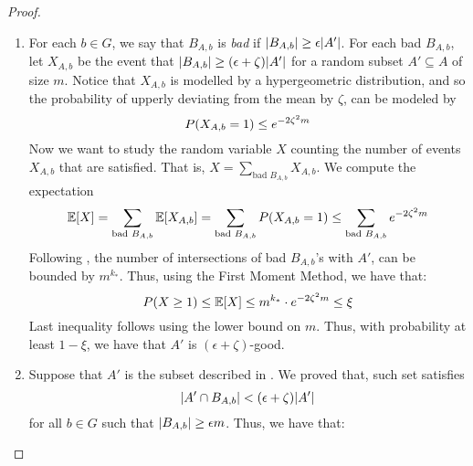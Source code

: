 \begin{lemma}[Claim 5.13]
            \begin{proof}
            \begin{enumerate}[label=(\alph*), ref=\alph*]
                \item For each $b \in G$, we say that $B_{A,b}$ is \emph{bad} if $| B_{A,b} | \geq \epsilon | A' |$.
                    For each bad $B_{A,b}$, let $X_{A,b}$ be the event that
                    $| B_{A,b} | \geq ( \epsilon + \zeta ) | A' |$ for a random subset
                    $A' \subseteq A$ of size $m$.
                    Notice that $X_{A,b}$ is modelled by a hypergeometric distribution, and so the probability of
                    upperly deviating from the mean by $\zeta$, can be modeled by
                    \[
                        P( X_{A,b} = 1 ) \leq e^{-2\zeta^2 m}
                    \]
                    Now we want to study the random variable $X$ counting the number of events $X_{A,b}$ that are satisfied.
                    That is, $X = \sum_{\text{bad } B_{A,b}} X_{A,b}$.
                    We compute the expectation
                    \[
                        \mathbb{E}[X] = \sum_{\text{bad } B_{A,b}} \mathbb{E}[X_{A,b}]
                            = \sum_{\text{bad } B_{A,b}} P( X_{A,b} = 1 )
                            \leq \sum_{\text{bad } B_{A,b}} e^{-2\zeta^2 m}
                    \]
                    Following , the number of intersections of bad $B_{A,b}$'s with $A'$, can be bounded
                    by $m^{k_*}$.
                    Thus, using the First Moment Method, we have that:
                    \[
                        P( X \geq 1 ) \leq \mathbb{E}[X] \leq m^{k_*} \cdot e^{-2\zeta^2 m} \leq \xi
                    \]
                    Last inequality follows  using the lower bound on $m$.
                    Thus, with probability at least $1 - \xi$, we have that $A'$ is $(\epsilon + \zeta)$-good.
                \item Suppose that $A'$ is the subset described in .
                    We proved that, such set satisfies
                    \[
                        | A' \cap B_{A,b} | < ( \epsilon + \zeta ) | A' |
                    \]
                    for all $b \in G$ such that $| B_{A,b} | \geq \epsilon m$.
                    Thus, we have that:
                    \begin{itemize}

\end{itemize}
\end{enumerate}
\end{proof}
\end{lemma}
